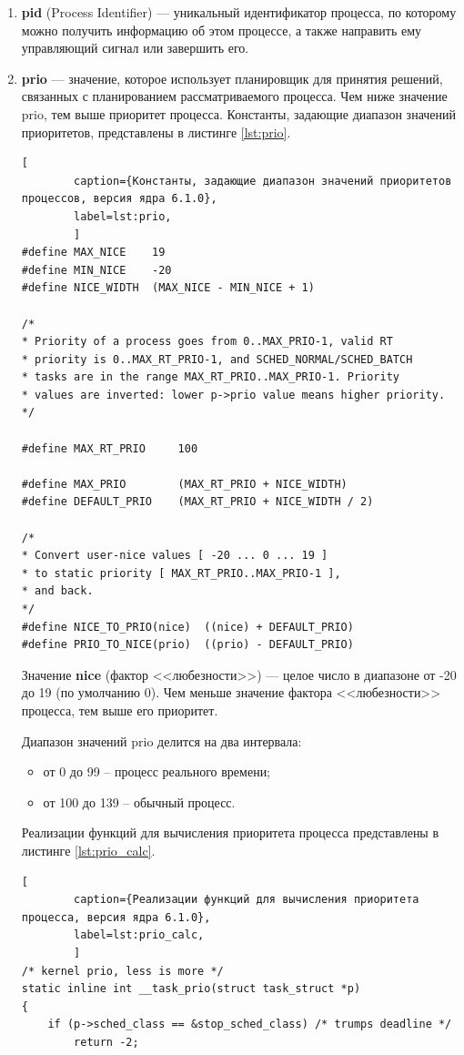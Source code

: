 \begin{enumerate}[label*=\arabic*.]
	\item \textbf{pid} (Process Identifier) --- уникальный идентификатор процесса, по которому можно получить информацию об этом процессе, а также направить ему управляющий сигнал или завершить его.
	\item \textbf{prio} --- значение, которое использует планировщик для принятия решений, связанных с планированием рассматриваемого процесса. Чем ниже значение prio, тем выше приоритет процесса. Константы, задающие диапазон значений приоритетов, представлены в листинге \ref{lst:prio}. \cite{nice}
	
	\begin{lstlisting}[
		caption={Константы, задающие диапазон значений приоритетов процессов, версия ядра 6.1.0},
		label=lst:prio,
		]
#define MAX_NICE	19
#define MIN_NICE	-20
#define NICE_WIDTH	(MAX_NICE - MIN_NICE + 1)

/*
* Priority of a process goes from 0..MAX_PRIO-1, valid RT
* priority is 0..MAX_RT_PRIO-1, and SCHED_NORMAL/SCHED_BATCH
* tasks are in the range MAX_RT_PRIO..MAX_PRIO-1. Priority
* values are inverted: lower p->prio value means higher priority.
*/

#define MAX_RT_PRIO		100

#define MAX_PRIO		(MAX_RT_PRIO + NICE_WIDTH)
#define DEFAULT_PRIO	(MAX_RT_PRIO + NICE_WIDTH / 2)

/*
* Convert user-nice values [ -20 ... 0 ... 19 ]
* to static priority [ MAX_RT_PRIO..MAX_PRIO-1 ],
* and back.
*/
#define NICE_TO_PRIO(nice)	((nice) + DEFAULT_PRIO)
#define PRIO_TO_NICE(prio)	((prio) - DEFAULT_PRIO)
	\end{lstlisting}

	Значение \textbf{nice} (фактор <<любезности>>) --- целое число в диапазоне от -20 до 19 (по умолчанию 0). Чем меньше значение фактора <<любезности>> процесса, тем выше его приоритет.
	
	Диапазон значений prio делится на два интервала:
	\begin{itemize}[leftmargin=1.6\parindent]
		\item от 0 до 99 -- процесс реального времени;
		\item от 100 до 139 -- обычный процесс.
	\end{itemize}

	Реализации функций для вычисления приоритета процесса представлены в листинге \ref{lst:prio_calc}. \cite{prio_calc}
	
	\begin{lstlisting}[
		caption={Реализации функций для вычисления приоритета процесса, версия ядра 6.1.0},
		label=lst:prio_calc,
		]
/* kernel prio, less is more */
static inline int __task_prio(struct task_struct *p)
{
	if (p->sched_class == &stop_sched_class) /* trumps deadline */
		return -2;
	

\end{lstlisting}
\end{enumerate}
